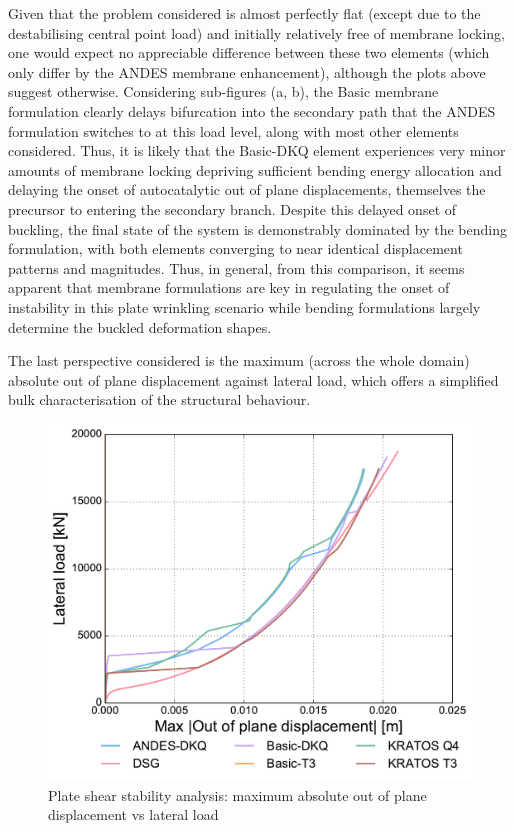 Given that the problem considered is almost perfectly flat (except due to the destabilising central point load) and initially relatively free of membrane locking, one would expect no appreciable difference between these two elements (which only differ by the ANDES membrane enhancement), although the plots above suggest otherwise. Considering sub-figures (a, b), the Basic membrane formulation clearly delays bifurcation into the secondary path that the ANDES formulation switches to at this load level, along with most other elements considered. Thus, it is likely that the Basic-DKQ element experiences very minor amounts of membrane locking depriving sufficient bending energy allocation and delaying the onset of autocatalytic out of plane displacements, themselves the precursor to entering the secondary branch. Despite this delayed onset of buckling, the final state of the system is demonstrably dominated by the bending formulation, with both elements converging to near identical displacement patterns and magnitudes. Thus, in general, from this comparison, it seems apparent that membrane formulations are key in regulating the onset of instability in this plate wrinkling scenario while bending formulations largely determine the buckled deformation shapes.

The last perspective considered is the maximum (across the whole domain) absolute out of plane displacement against lateral load, which offers a simplified bulk characterisation of the structural behaviour.

\begin{figure}[H]
	\centering
	\def\svgwidth{\columnwidth}
	\includegraphics[width=12cm]{images/stability_wrinkle_abstrans_disp.pdf}
	\caption{Plate shear stability analysis: maximum absolute out of plane displacement vs lateral load}
	\label{pic:wrinkle3}
\end{figure}

